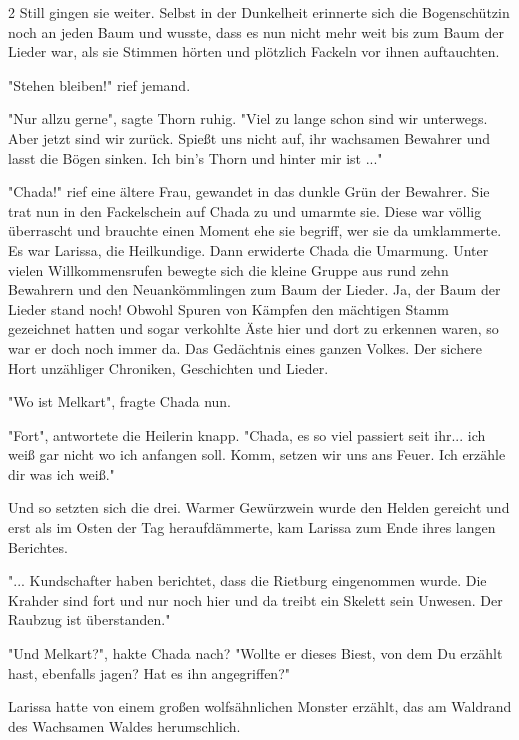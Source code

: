 \documentclass[10pt, a4paper, oneside]{book}
\begin{document}
\begin{multicols}{2}
Still gingen sie weiter. Selbst in der Dunkelheit erinnerte sich die Bogenschützin noch an jeden Baum und wusste, dass es nun nicht mehr weit bis zum Baum der Lieder war, als sie Stimmen hörten und plötzlich Fackeln vor ihnen auftauchten.

"Stehen bleiben!" rief jemand.

"Nur allzu gerne", sagte Thorn ruhig. "Viel zu lange schon sind wir unterwegs. Aber jetzt sind wir zurück. Spießt uns nicht auf, ihr wachsamen Bewahrer und lasst die Bögen sinken. Ich bin’s Thorn und hinter mir ist ..."

"Chada!" rief eine ältere Frau, gewandet in das dunkle Grün der Bewahrer. Sie trat nun in den Fackelschein auf Chada zu und umarmte sie. Diese war völlig überrascht und brauchte einen Moment ehe sie begriff, wer sie da umklammerte. Es war Larissa, die Heilkundige. Dann erwiderte Chada die Umarmung. Unter vielen Willkommensrufen bewegte sich die kleine Gruppe aus rund zehn Bewahrern und den Neuankömmlingen zum Baum der Lieder. Ja, der Baum der Lieder stand noch! Obwohl Spuren von Kämpfen den mächtigen Stamm gezeichnet hatten und sogar verkohlte Äste hier und dort zu erkennen waren, so war er doch noch immer da. Das Gedächtnis eines ganzen Volkes. Der sichere Hort unzähliger Chroniken, Geschichten und Lieder.

"Wo ist Melkart", fragte Chada nun.

"Fort", antwortete die Heilerin knapp. "Chada, es so viel passiert seit ihr... ich weiß gar nicht wo ich anfangen soll. Komm, setzen wir uns ans Feuer. Ich erzähle dir was ich weiß."

Und so setzten sich die drei. Warmer Gewürzwein wurde den Helden gereicht und erst als im Osten der Tag heraufdämmerte, kam Larissa zum Ende ihres langen Berichtes.

"... Kundschafter haben berichtet, dass die Rietburg eingenommen wurde. Die Krahder sind fort und nur noch hier und da treibt ein Skelett sein Unwesen. Der Raubzug ist überstanden."

"Und Melkart?", hakte Chada nach? "Wollte er dieses Biest, von dem Du erzählt hast, ebenfalls jagen? Hat es ihn angegriffen?"

Larissa hatte von einem großen wolfsähnlichen Monster erzählt, das am Waldrand des Wachsamen Waldes herumschlich.


\end{multicols}
\end{document}
